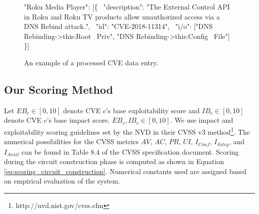 \begin{figure}[t]
    \centering
    \begin{minipage}{0.5\textwidth}
    \begingroup\ttfamily\obeylines
    "Roku Media Player": [\{
    \ "description": "The External Control API in Roku and Roku TV products allow unauthorized access via a DNS Rebind attack.", 
    \ "id": "CVE-2018-11314", 
    \ "i/o": ["DNS Rebinding->this:Root 
    \ Priv", "DNS Rebinding->this:Config 
    \ File"]  \}]
    \endgroup
    \end{minipage}
    \caption{An example of a processed CVE data entry.}
    \label{fig:processed_cve}
\end{figure}


\subsection{Our Scoring Method}

Let $EB_c \in [0,10]$ denote CVE $c$'s base exploitability score and $IB_c \in [0,10]$ denote CVE $c$'s base impact score. $EB_c, IB_c \in [0,10].$ We use impact and exploitability scoring guidelines set by the NVD in their CVSS v3 method\footnote{http://nvd.nist.gov/cvss.cfm}. The numerical possibilities for the CVSS metrics $AV$, $AC$, $PR$, $UI$, $I_{Conf}$, $I_{Integ}$, and $I_{Avail}$ can be found in Table 8.4 of the CVSS specification document. Scoring during the circuit construction phase is computed as shown in Equation \ref{eq:scoring_circuit_construction}. Numerical constants used are assigned based on empirical evaluation of the system. 

